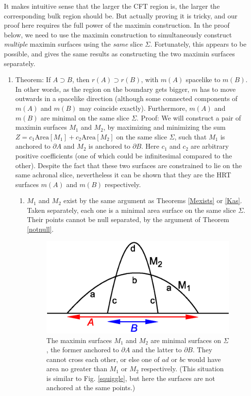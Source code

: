 \documentclass{article}
\begin{document}
It makes intuitive sense that the larger the CFT region is, the larger the corresponding bulk region should be.  But actually proving it is tricky, and our proof here requires the full power of the maximin construction.  In the proof below, we need to use the maximin construction to simultaneously construct \emph{multiple} maximin surfaces using the \emph{same} slice $\Sigma$.  Fortunately, this appears to be possible, and gives the same results as constructing the two maximin surfaces separately.

\begin{enumerate}[resume]
\item \label{outward} Theorem: If $A \supset B$, then $r(A) \supset r(B)$, with $m(A)$ spacelike to $m(B)$.  In other words, as the region on the boundary gets bigger, $m$ has to move outwards in a spacelike direction (although some connected components of $m(A)$ and $m(B)$ may coincide exactly).  Furthermore, $m(A)$ and $m(B)$ are minimal on the same slice $\Sigma$.  Proof: We will construct a pair of maximin surfaces $M_1$ and $M_2$, by maximizing and minimizing the sum $Z = c_1 \mathrm{Area}[M_1] + c_2 \mathrm{Area}[M_2]$ on the same slice $\Sigma$, such that $M_1$ is anchored to $\partial A$ and $M_2$ is anchored to $\partial B$.  Here $c_1$ and $c_2$ are arbitrary positive coefficients (one of which could be infinitesimal compared to the other).  Despite the fact that these two surfaces are constrained to lie on the same achronal slice, nevertheless it can be shown that they are the HRT surfaces $m(A)$ and $m(B)$ respectively.
	\begin{enumerate}
	\item $M_1$ and $M_2$ exist by the same argument as Theorems \ref{Mexists} or \ref{Kas}.  Taken separately, each one is a minimal area surface on the same slice $\Sigma$.  Their points cannot be null separated, by the argument of Theorem \ref{notnull}.
\begin{figure}[hbt]
\centering
\includegraphics[width=.5\textwidth]{cross.eps}
\caption{\footnotesize The maximin surfaces $M_1$ and $M_2$ are minimal surfaces on $\Sigma$, the former anchored to $\partial A$ and the latter to $\partial B$.  They cannot cross each other, or else one of $ad$ or $bc$ would have area no greater than $M_1$ or $M_2$ respectively.  (This situation is similar to Fig. \ref{squiggle}, but here the surfaces are not anchored at the same points.)
}
\end{figure}
\end{enumerate}
\end{enumerate}
\end{document}
